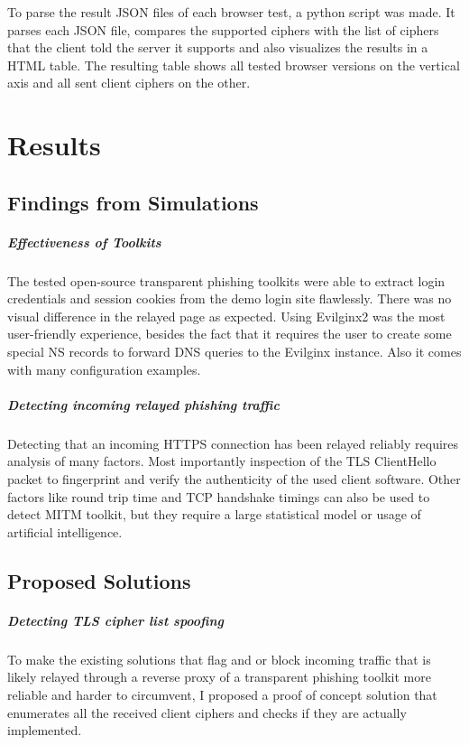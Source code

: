 \documentclass[12pt]{scrbook}
\begin{document}
To parse the result JSON files of each browser test, a python script was made.
It parses each JSON file, compares the supported ciphers
with the list of ciphers that the client told the server it supports and also
visualizes the results in a HTML table.
The resulting table shows all tested browser versions on the vertical axis and
all sent client ciphers on the other.

\newpage

\chapter{Results}
\section{Findings from Simulations}

\paragraph{Effectiveness of Toolkits}
The tested open-source transparent phishing toolkits were able to extract login credentials
and session cookies from the demo login site flawlessly. There was no visual difference in the relayed page
as expected. Using Evilginx2 was the most user-friendly experience, besides the fact that it requires the user
to create some special NS records to forward DNS queries to the Evilginx instance. Also it comes with many
configuration examples.

\paragraph{Detecting incoming relayed phishing traffic}
Detecting that an incoming HTTPS connection has been relayed reliably requires
analysis of many factors. Most importantly inspection of the TLS ClientHello packet
to fingerprint and verify the authenticity of the used client software.
Other factors like round trip time and TCP handshake timings can also be used to
detect MITM toolkit, but they require a large statistical model or usage of artificial intelligence.

\section{Proposed Solutions}
\paragraph{Detecting TLS cipher list spoofing}
To make the existing solutions that flag and or block incoming traffic that is likely
relayed through a reverse proxy of a transparent phishing toolkit more reliable and harder
to circumvent, I proposed a proof of concept solution that enumerates all the received
client ciphers and checks if they are actually implemented.
\end{document}
